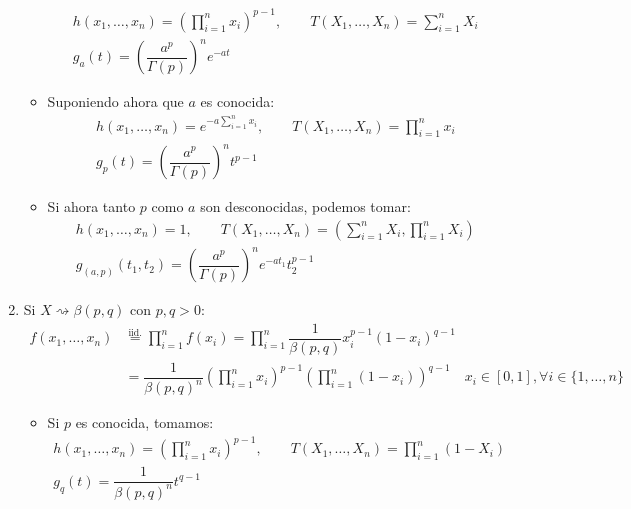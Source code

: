 \begin{ejercicio}
\begin{enumerate}[label=\alph*)]
\begin{itemize}
                    \begin{gather*}
                        h(x_1, \ldots, x_n) = {\left(\prod_{i=1}^{n}x_i\right)}^{p-1}, \qquad  T(X_1, \ldots, X_n) = \sum_{i=1}^{n} X_i \\
                        g_a(t) = {\left(\dfrac{a^p}{\Gamma(p)}\right)}^{n}e^{-at}
                    \end{gather*}
                \item Suponiendo ahora que $a$ es conocida:
                    \begin{gather*}
                        h(x_1, \ldots, x_n) = e^{-a\sum\limits_{i=1}^n x_i}, \qquad T(X_1, \ldots, X_n) = \prod_{i=1}^{n}x_i \\
                        g_p(t) = {\left(\dfrac{a^p}{\Gamma(p)}\right)}^{n} t^{p-1}
                    \end{gather*}
                \item Si ahora tanto $p$ como $a$ son desconocidas, podemos tomar:
                    \begin{gather*}
                        h(x_1, \ldots, x_n) = 1, \qquad T(X_1, \ldots, X_n) = \left(\sum_{i=1}^{n}X_i, \prod_{i=1}^{n} X_i\right) \\
                        g_{(a,p)}(t_1,t_2) = {\left(\dfrac{a^p}{\Gamma(p)}\right)}^{n}e^{-at_1}t_2^{p-1}
                    \end{gather*}
            \end{itemize}
        \item Si $X\rightsquigarrow\beta(p,q)$ con $p,q>0$:
            \begin{align*}
                f(x_1, \ldots, x_n) &\stackrel{\text{iid.}}{=} \prod_{i=1}^{n}f(x_i) = \prod_{i=1}^{n} \dfrac{1}{\beta(p,q)} x_i^{p-1} {(1-x_i)}^{q-1} \\
                &= \dfrac{1}{{\beta(p,q)}^{n}} {\left(\prod_{i=1}^{n}x_i\right)}^{p-1} {\left(\prod_{i=1}^{n}(1-x_i)\right)}^{q-1} \quad x_i \in [0,1], \forall i \in \{1,\ldots,n\}
            \end{align*}
            \begin{itemize}
                \item Si $p$ es conocida, tomamos:
                    \begin{gather*}
                        h(x_1, \ldots, x_n) = {\left(\prod_{i=1}^{n}x_i\right)}^{p-1}, \qquad T(X_1, \ldots, X_n) = \prod_{i=1}^{n}(1-X_i) \\
                        g_q(t) = \dfrac{1}{{\beta(p,q)}^{n}} t^{q-1}

\end{gather*}
\end{itemize}
\end{enumerate}
\end{ejercicio}
